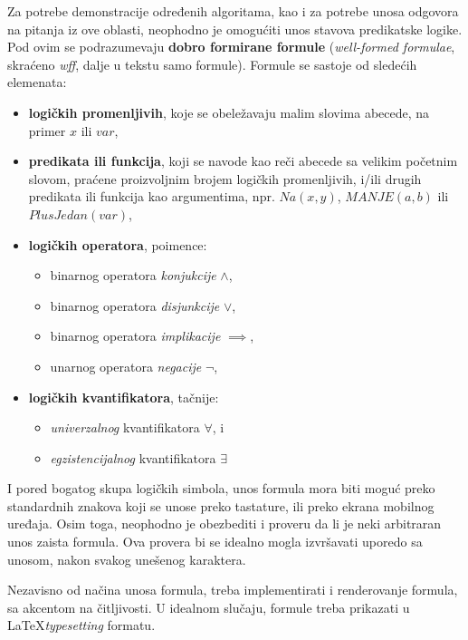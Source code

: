 Za potrebe demonstracije određenih algoritama, kao i za potrebe unosa odgovora na pitanja iz ove oblasti, neophodno je omogućiti unos stavova predikatske logike. Pod ovim se podrazumevaju \textbf{dobro formirane formule} (\textit{well-formed formulae}, skraćeno \textit{wff}, dalje u tekstu samo formule). Formule se sastoje od sledećih elemenata:
\begin{itemize}
\item \textbf{logičkih promenljivih}, koje se obeležavaju malim slovima abecede, na primer $x$ ili $var$,
\item \textbf{predikata ili funkcija}, koji se navode kao reči abecede sa velikim početnim slovom, praćene proizvoljnim brojem logičkih promenljivih, i/ili drugih predikata ili funkcija kao argumentima, npr. $\mathit{Na}(x, y)$, $\mathit{MANJE}(a, b)$ ili $\mathit{PlusJedan}(var)$,
\item \textbf{logičkih operatora}, poimence:
\begin{itemize}
\item binarnog operatora \emph{konjukcije} $\land$,
\item binarnog operatora \emph{disjunkcije} $\lor$,
\item binarnog operatora \emph{implikacije} $\implies$,
\item unarnog operatora \emph{negacije} $\neg$,
\end{itemize}
\item \textbf{logičkih kvantifikatora}, tačnije:
\begin{itemize}
\item \emph{univerzalnog} kvantifikatora $\forall$, i
\item \emph{egzistencijalnog} kvantifikatora $\exists$
\end{itemize}
\end{itemize}
I pored bogatog skupa logičkih simbola, unos formula mora biti moguć preko standardnih znakova koji se unose preko tastature, ili preko ekrana mobilnog uređaja. Osim toga, neophodno je obezbediti i proveru da li je neki arbitraran unos zaista formula. Ova provera bi se idealno mogla izvršavati uporedo sa unosom, nakon svakog unešenog karaktera.

Nezavisno od načina unosa formula, treba implementirati i renderovanje formula, sa akcentom na čitljivosti. U idealnom slučaju, formule treba prikazati u \LaTeX \space \textit{typesetting} formatu.

